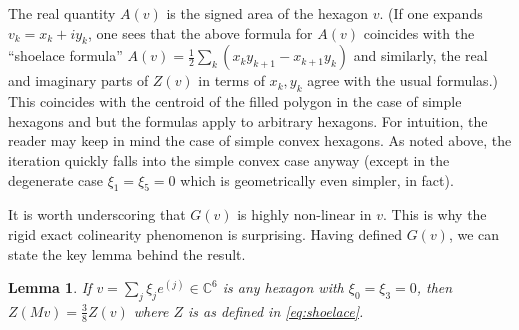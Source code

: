 \documentclass{amsart}
\newcommand*\C{\mathbb C}
\newtheorem{lemma}[theorem]{Lemma}
\theoremstyle{definition}
\begin{document}
The real quantity $A(v)$ is the signed area of the hexagon $v$. (If one expands $v_k = x_k+iy_k$, one sees that the above formula for $A(v)$ coincides with the ``shoelace formula'' $A(v) = \frac12\sum_k (x_ky_{k+1}-x_{k+1}y_k)$ and similarly, the real and imaginary parts of $Z(v)$ in terms of $x_k,y_k$ agree with the usual formulas.) This coincides with the centroid of the filled polygon in the case of simple hexagons and but the formulas apply to arbitrary hexagons. For intuition, the reader may keep in mind the case of simple convex hexagons. As noted above, the iteration quickly falls into the simple convex case anyway (except in the degenerate case $\xi_1=\xi_5=0$ which is geometrically even simpler, in fact).

It is worth underscoring that $G(v)$ is highly non-linear in $v$. This is why the rigid exact colinearity phenomenon is surprising. Having defined $G(v)$, we can state the key lemma behind the result.

\begin{lemma}
    If $v = \sum_j \xi_je^{(j)}\in \C^6$ is any hexagon with $\xi_0=\xi_3=0$, then $Z(Mv) = \frac38 Z(v)$ where $Z$ is as defined in \eqref{eq:shoelace}.
    \label{lemma:real_centroid_scaling}
\end{lemma}
\end{document}
